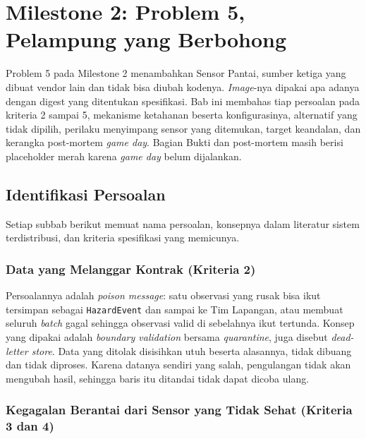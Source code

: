 \chapter[MILESTONE 2: PROBLEM 5]{Milestone 2: Problem 5, Pelampung yang Berbohong}

Problem 5 pada Milestone 2 menambahkan Sensor Pantai, sumber ketiga yang dibuat vendor lain dan tidak bisa diubah kodenya. \textit{Image}-nya dipakai apa adanya dengan digest yang ditentukan spesifikasi. Bab ini membahas tiap persoalan pada kriteria 2 sampai 5, mekanisme ketahanan beserta konfigurasinya, alternatif yang tidak dipilih, perilaku menyimpang sensor yang ditemukan, target keandalan, dan kerangka post-mortem \textit{game day}. Bagian Bukti dan post-mortem masih berisi placeholder merah karena \textit{game day} belum dijalankan.

\section{Identifikasi Persoalan}

Setiap subbab berikut memuat nama persoalan, konsepnya dalam literatur sistem terdistribusi, dan kriteria spesifikasi yang memicunya.

\subsection{Data yang Melanggar Kontrak (Kriteria 2)}

Persoalannya adalah \textit{poison message}: satu observasi yang rusak bisa ikut tersimpan sebagai \texttt{HazardEvent} dan sampai ke Tim Lapangan, atau membuat seluruh \textit{batch} gagal sehingga observasi valid di sebelahnya ikut tertunda. Konsep yang dipakai adalah \textit{boundary validation} bersama \textit{quarantine}, juga disebut \textit{dead-letter store}. Data yang ditolak disisihkan utuh beserta alasannya, tidak dibuang dan tidak diproses. Karena datanya sendiri yang salah, pengulangan tidak akan mengubah hasil, sehingga baris itu ditandai tidak dapat dicoba ulang.

\subsection{Kegagalan Berantai dari Sensor yang Tidak Sehat (Kriteria 3 dan 4)}

